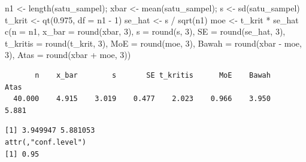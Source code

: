 \documentclass[
  indonesian,
  letterpaper,
]{book}
\newenvironment{Shaded}{\begin{snugshade}}{\end{snugshade}}
\newcommand{\AttributeTok}[1]{\textcolor[rgb]{0.40,0.45,0.13}{#1}}
\newcommand{\CommentTok}[1]{\textcolor[rgb]{0.37,0.37,0.37}{#1}}
\newcommand{\DecValTok}[1]{\textcolor[rgb]{0.68,0.00,0.00}{#1}}
\newcommand{\FloatTok}[1]{\textcolor[rgb]{0.68,0.00,0.00}{#1}}
\newcommand{\FunctionTok}[1]{\textcolor[rgb]{0.28,0.35,0.67}{#1}}
\newcommand{\NormalTok}[1]{\textcolor[rgb]{0.00,0.23,0.31}{#1}}
\newcommand{\OtherTok}[1]{\textcolor[rgb]{0.00,0.23,0.31}{#1}}
\newcommand{\SpecialCharTok}[1]{\textcolor[rgb]{0.37,0.37,0.37}{#1}}
\begin{document}
\begin{Shaded}
\begin{Highlighting}[]
\NormalTok{n1 }\OtherTok{\textless{}{-}} \FunctionTok{length}\NormalTok{(satu\_sampel); xbar }\OtherTok{\textless{}{-}} \FunctionTok{mean}\NormalTok{(satu\_sampel); s }\OtherTok{\textless{}{-}} \FunctionTok{sd}\NormalTok{(satu\_sampel)}
\NormalTok{t\_krit }\OtherTok{\textless{}{-}} \FunctionTok{qt}\NormalTok{(}\FloatTok{0.975}\NormalTok{, }\AttributeTok{df =}\NormalTok{ n1 }\SpecialCharTok{{-}} \DecValTok{1}\NormalTok{)}
\NormalTok{se\_hat }\OtherTok{\textless{}{-}}\NormalTok{ s }\SpecialCharTok{/} \FunctionTok{sqrt}\NormalTok{(n1)}
\NormalTok{moe }\OtherTok{\textless{}{-}}\NormalTok{ t\_krit }\SpecialCharTok{*}\NormalTok{ se\_hat}
\FunctionTok{c}\NormalTok{(}\AttributeTok{n =}\NormalTok{ n1, }\AttributeTok{x\_bar =} \FunctionTok{round}\NormalTok{(xbar, }\DecValTok{3}\NormalTok{), }\AttributeTok{s =} \FunctionTok{round}\NormalTok{(s, }\DecValTok{3}\NormalTok{), }\AttributeTok{SE =} \FunctionTok{round}\NormalTok{(se\_hat, }\DecValTok{3}\NormalTok{),}
\AttributeTok{t\_kritis =} \FunctionTok{round}\NormalTok{(t\_krit, }\DecValTok{3}\NormalTok{), }\AttributeTok{MoE =} \FunctionTok{round}\NormalTok{(moe, }\DecValTok{3}\NormalTok{),}
\AttributeTok{Bawah =} \FunctionTok{round}\NormalTok{(xbar }\SpecialCharTok{{-}}\NormalTok{ moe, }\DecValTok{3}\NormalTok{), }\AttributeTok{Atas =} \FunctionTok{round}\NormalTok{(xbar }\SpecialCharTok{+}\NormalTok{ moe, }\DecValTok{3}\NormalTok{))}
\end{Highlighting}
\end{Shaded}

\begin{verbatim}
       n    x_bar        s       SE t_kritis      MoE    Bawah     Atas 
  40.000    4.915    3.019    0.477    2.023    0.966    3.950    5.881 
\end{verbatim}

\begin{Shaded}
\end{Shaded}

\begin{verbatim}
[1] 3.949947 5.881053
attr(,"conf.level")
[1] 0.95
\end{verbatim}
\end{document}
